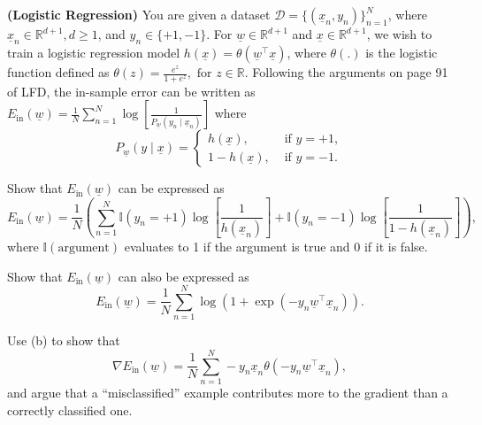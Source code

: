 \documentclass{article}
\theoremstyle{definition}
\begin{document}
\begin{question}
	\item \textbf{(Logistic Regression)} You are given a dataset $\mathcal{D} = \{(\underline{x}_n, y_n)\}_{n=1}^N$, where $\underline{x}_n \in \mathbb{R}^{d+1}, d \geq 1$, and $y_n \in \{+1,-1\}$. For $\underline{w} \in \mathbb{R}^{d+1}$ and $\underline{x} \in \mathbb{R}^{d+1}$, we wish to train a logistic regression model $h(\underline{x}) = \theta(\underline{w}^\top \underline{x})$, where $\theta(.)$ is the logistic function defined as $\theta(z) = \frac{e^z}{1 + e^z}, \text{ for } z \in \mathbb{R}$. Following the arguments on page 91 of LFD, the in-sample error can be written as
	$E_{\text{in}}(\underline{w}) = \frac{1}{N} \sum_{n=1}^N \log\left[\frac{1}{P_{\underline{w}}(y_n \mid \underline{x}_n)}\right]$ where
	\begin{equation*}
	P_{\underline{w}}(y \mid \underline{x}) = \begin{cases}
		h(\underline{x}), & \text{ if }y = +1, \\
		1 - h(\underline{x}), & \text{ if }y = -1.
	\end{cases}
	\end{equation*}
	\begin{question}
		\item Show that $E_{\text{in}}(\underline{w})$ can be expressed as
		\begin{equation*}
			E_{\text{in}}(\underline{w}) = \frac{1}{N} \left( \sum_{n=1}^N \mathbb{I}(y_n = +1) \log\left[\frac{1}{h(\underline{x}_n)}\right] + \mathbb{I}(y_n = -1) \log\left[\frac{1}{1 - h(\underline{x}_n)}\right] \right),
		\end{equation*}
		where $\mathbb{I}(\text{argument})$ evaluates to 1 if the argument is true and 0 if it is false.
		\item Show that $E_{\text{in}}(\underline{w})$ can also be expressed as
		\begin{equation*}
			E_{\text{in}}(\underline{w}) = \frac{1}{N} \sum_{n=1}^N \log(1 + \exp(-y_n \underline{w}^\top \underline{x}_n)).
		\end{equation*}
		\item Use (b) to show that
		\begin{equation*}
			\nabla E_{\text{in}}(\underline{w}) = \frac{1}{N} \sum_{n=1}^N -y_n \underline{x}_n \theta(-y_n \underline{w}^\top \underline{x}_n),
		\end{equation*}
		and argue that a ``misclassified'' example contributes more to the gradient than a correctly classified one.
	\end{question}
	

\end{question}
\end{document}
